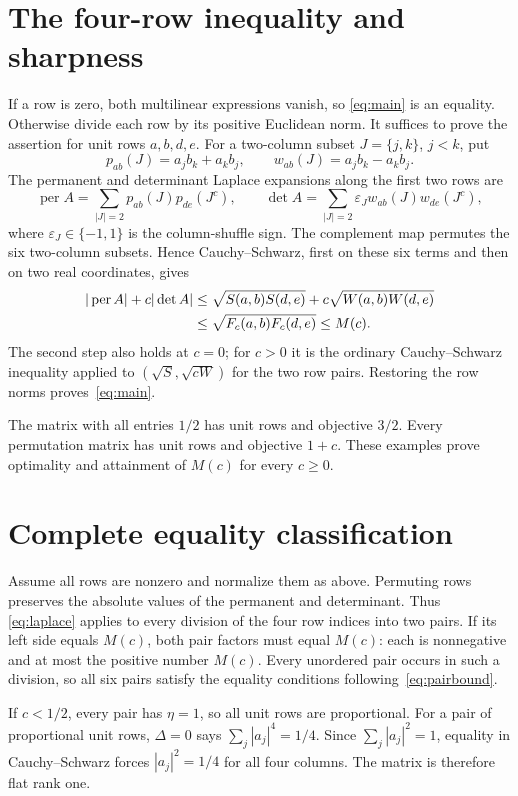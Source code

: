 \documentclass[11pt]{article}
\DeclareMathOperator{\per}{per}
\begin{document}
\section{The four-row inequality and sharpness}
If a row is zero, both multilinear expressions vanish, so
\eqref{eq:main} is an equality. Otherwise divide each row by its positive
Euclidean norm. It suffices to prove the assertion for unit rows
$a,b,d,e$. For a two-column subset $J=\{j,k\}$, $j<k$, put
\[
 p_{ab}(J)=a_jb_k+a_kb_j,\qquad
 w_{ab}(J)=a_jb_k-a_kb_j.
\]
The permanent and determinant Laplace expansions along the first two rows
are
\[
 \per A=\sum_{|J|=2}p_{ab}(J)p_{de}(J^c),\qquad
 \det A=\sum_{|J|=2}\varepsilon_J w_{ab}(J)w_{de}(J^c),
\]
where $\varepsilon_J\in\{-1,1\}$ is the column-shuffle sign.
The complement map permutes the six two-column subsets. Hence
Cauchy--Schwarz, first on these six terms and then on two real coordinates,
gives
\begin{align}
 |\per A|+c|\det A|
 &\le\sqrt{S(a,b)S(d,e)}+c\sqrt{W(a,b)W(d,e)}\notag\\
 &\le\sqrt{F_c(a,b)F_c(d,e)}\le M(c).\label{eq:laplace}
\end{align}
The second step also holds at $c=0$; for $c>0$ it is the ordinary
Cauchy--Schwarz inequality applied to
$(\sqrt S,\sqrt{cW})$ for the two row pairs. Restoring the row norms
proves~\eqref{eq:main}.

The matrix with all entries $1/2$ has unit rows and objective $3/2$.
Every permutation matrix has unit rows and objective $1+c$. These
examples prove optimality and attainment of $M(c)$ for every $c\ge0$.

\section{Complete equality classification}
Assume all rows are nonzero and normalize them as above. Permuting rows
preserves the absolute values of the permanent and determinant. Thus
\eqref{eq:laplace} applies to every division of the four row indices into
two pairs. If its left side equals $M(c)$, both pair factors must equal
$M(c)$: each is nonnegative and at most the positive number $M(c)$.
Every unordered pair occurs in such a division, so all six pairs satisfy
the equality conditions following~\eqref{eq:pairbound}.

If $c<1/2$, every pair has $\eta=1$, so all unit rows are proportional.
For a pair of proportional unit rows, $\Delta=0$ says
$\sum_j|a_j|^4=1/4$. Since $\sum_j|a_j|^2=1$, equality in
Cauchy--Schwarz forces $|a_j|^2=1/4$ for all four columns.
The matrix is therefore flat rank one.
\end{document}
